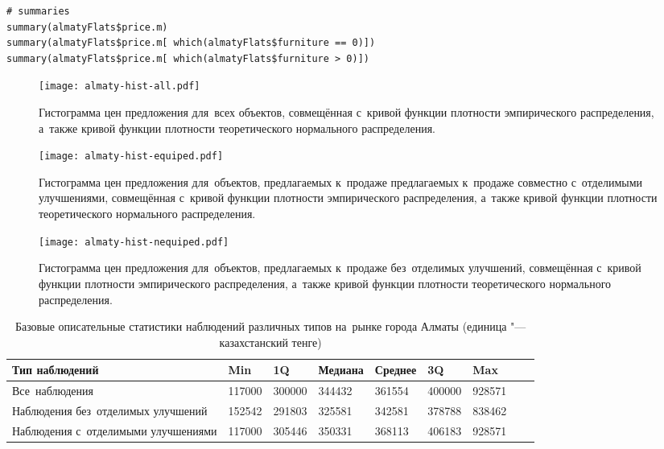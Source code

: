 \documentclass[]{scrartcl}
\begin{document}
%
\begin{lstlisting}[float, caption = Построение базовых описательных статистик для~наблюдений различных типов, firstnumber=1, label= lst:summaries-R]
# summaries
summary(almatyFlats$price.m)
summary(almatyFlats$price.m[ which(almatyFlats$furniture == 0)])
summary(almatyFlats$price.m[ which(almatyFlats$furniture > 0)])
\end{lstlisting}
%
\begin{figure}[ht]
	\centering
	\texttt{[image: almaty-hist-all.pdf]}
	\caption{Гистограмма цен предложения для~всех объектов, совмещённая с~кривой функции плотности эмпирического распределения, а~также кривой функции плотности теоретического нормального распределения.}
	\label{fig:almaty-hist-all-r}
\end{figure}
%
%
\begin{figure}[ht]
	\centering
	\texttt{[image: almaty-hist-equiped.pdf]}
	\caption{Гистограмма цен предложения для~объектов, предлагаемых к~продаже предлагаемых к~продаже совместно с~отделимыми улучшениями, совмещённая с~кривой функции плотности эмпирического распределения, а~также кривой функции плотности теоретического нормального распределения.}
	\label{fig:almaty-hist-equiped-r}
\end{figure}
%
%
\begin{figure}[ht]
	\centering
	\texttt{[image: almaty-hist-nequiped.pdf]}
	\caption{Гистограмма цен предложения для~объектов, предлагаемых к~продаже без~отделимых улучшений, совмещённая с~кривой функции плотности эмпирического распределения, а~также кривой функции плотности теоретического нормального распределения.}
	\label{fig:almaty-hist-nequiped-r}
\end{figure}
%
\begin{table}[ht]
	\caption{Базовые описательные статистики наблюдений различных типов на~рынке города Алматы (единица "--- казахстанский тенге)}\label{tab:summaries-almaty-R}
	\centering
	\begin{tabular}{lllllllll}
		\hline
		Тип наблюдений&Min&1Q&Медиана&Среднее&3Q&Max\\
		\hline
		Все~наблюдения&117000&300000&344432&361554&400000&928571\\
		\hline
		Наблюдения без~отделимых улучшений&152542&291803&325581&342581&378788&838462\\
		\hline
		Наблюдения с~отделимыми улучшениями&117000&305446&350331&368113&406183&928571\\
		\hline
	\end{tabular}
\end{table}
\end{document}
